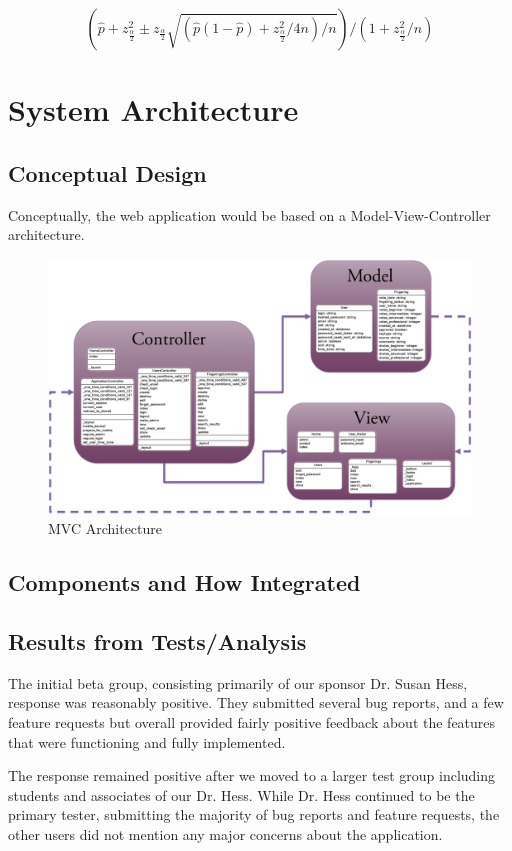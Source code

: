 \documentclass[12pt,english]{article}
\begin{document}
\[
(\hat{p}+z_{\frac{\alpha}{2}}^{2}\pm z_{\frac{\alpha}{2}}\sqrt{(\hat{p}(1-\hat{p})+z_{\frac{\alpha}{2}}^{2}/4n)/n})/(1+z_{\frac{\alpha}{2}}^{2}/n)
\]

\section{System Architecture}
\subsection{Conceptual Design}
Conceptually, the web application would be based on a Model-View-Controller
architecture.

\begin{figure}[H]
	\caption{MVC Architecture}
	\includegraphics[scale=0.15]{MVC} 
\end{figure}

\subsection{Components and How Integrated}


\subsection{Results from Tests/Analysis}
The initial beta group, consisting primarily of our sponsor Dr. Susan Hess,
response was reasonably positive.  They submitted several bug reports, 
and a few feature requests but overall provided fairly positive feedback 
about the features that were functioning and fully implemented.

The response remained positive after we moved to a larger test group
including students and associates of our Dr. Hess.  While Dr. Hess continued
to be the primary tester, submitting the majority of bug reports and feature
requests, the other users did not mention any major concerns about the application.
\end{document}
